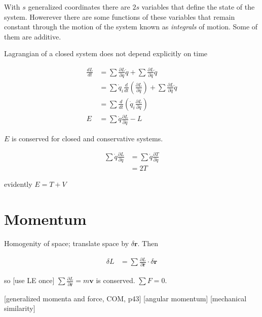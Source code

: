 \documentclass{article}
\newcommand{\mb}{\mathbf}
\begin{document}
With $s$ generalized coordinates there are $2s$ variables that define the state of the system. Howerever there are some functions of these variables that remain constant through the motion of the system known as \emph{integrals} of motion. Some of them are additive.

Lagrangian of a closed system does not depend explicitly on time

\begin{align}
\frac{dL}{dt} &= \sum\frac{\partial L}{\partial q} \dot{q} + \sum \frac{\partial L}{\partial \dot{q}} \ddot{q} \\
&= \sum\dot{q}_i \frac{d}{dt} \left(\frac{\partial L}{\partial \dot{q}}\right) + \sum \frac{\partial L}{\partial \dot{q}} \ddot{q} \\
&= \sum \frac{d}{dt}\left(\dot{q}_i \frac{\partial L}{\partial \dot{q}}\right) \\
E &= \sum\dot{q}\frac{\partial L}{\partial \dot{q}} - L
\end{align}

$E$ is conserved for closed and conservative systems.

\begin{align}
\sum\dot{q}\frac{\partial L}{\partial \dot{q}} &= \sum\dot{q}\frac{\partial T}{\partial \dot{q}} \\
&= 2T
\end{align}

evidently $E = T+V$

\section{Momentum}

Homogenity of space; translate space by $\delta \mb{r}$. Then

\begin{align}
\delta L &= \sum\frac{\partial L}{\partial \mb{r}} \cdot \delta\mb{r}
\end{align}

so [use LE once] $\sum\frac{\partial L}{\partial \mb{r}} = m\mb{v}$ is conserved. $\sum F = 0$.

[generalized momenta and force, COM, p43]
[angular momentum]
[mechanical similarity]
\end{document}
